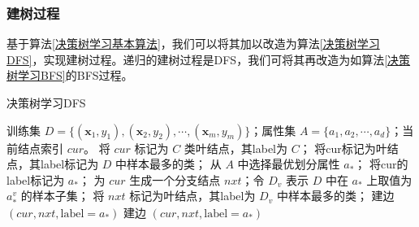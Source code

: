 \documentclass{ctexart}
\begin{document}
	\subsubsection{建树过程}
	
	基于算法\ref{决策树学习基本算法}，我们可以将其加以改造为算法\ref{决策树学习DFS}，实现建树过程。递归的建树过程是DFS，我们可将其再改造为如算法\ref{决策树学习BFS}的BFS过程。
	
	\begin{algorithm}[!htb]
		\caption{决策树学习DFS}  
		\label{决策树学习DFS}
		\begin{algorithmic}[1]
			\Require  
			训练集 $D=\{(\bm{x}_1,y_1),(\bm{x}_2,y_2),\cdots,(\bm{x}_m,y_m)\}$；属性集 $A=\{a_1,a_2,\cdots,a_d\}$；当前结点索引 $cur$。
					\State 将 $cur$ 标记为 $C$ 类叶结点，其label为 $C$；
					\Return
				\EndIf
					\State 将cur标记为叶结点，其label标记为 $D$ 中样本最多的类；
					\Return
				\EndIf
				\State 从 $A$ 中选择最优划分属性 $a_\ast$；
				\State 将cur的label标记为 $a_\ast$；
					\State 为 $cur$ 生成一个分支结点 $nxt$；令 $D_v$ 表示 $D$ 中在 $a_\ast$ 上取值为 $a_\ast^v$ 的样本子集；
						\State 将 $nxt$ 标记为叶结点，其label为 $D_v$ 中样本最多的类；
						\State 建边 $(cur, nxt, \text{label}=a_\ast)$
						\Return
					\Else
						\State {}
						\State 建边 $(cur, nxt, \text{label}=a_\ast)$
					\EndIf
				\EndFor
			\EndFunction
		\end{algorithmic}  
	\end{algorithm}
\end{document}
